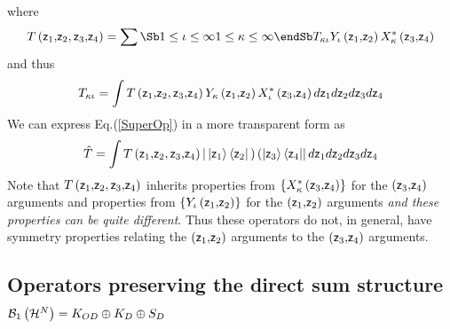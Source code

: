 where 
\begin{equation}
T\left( {\sf z}_{1}{\bf ,}{\sf z}_{2},{\sf z}_{3}{\bf ,}{\sf z}_{4}\right)
=\sum\Sb 1\leq \iota \leq \infty  \\ 1\leq \kappa \leq \infty  \endSb %
T_{\kappa \iota }Y_{\iota }\left( {\sf z}_{1}{\bf ,}{\sf z}_{2}\right)
X_{\kappa }^{\ast }\left( {\sf z}_{3}{\bf ,}{\sf z}_{4}\right)
\end{equation}%
and thus%
\begin{equation}
T_{\kappa \iota }=\int T\left( {\sf z}_{1}{\bf ,}{\sf z}_{2},{\sf z}_{3}{\bf %
,}{\sf z}_{4}\right) Y_{\kappa }\left( {\sf z}_{1}{\bf ,}{\sf z}_{2}\right)
X_{\iota }^{\ast }\left( {\sf z}_{3}{\bf ,}{\sf z}_{4}\right) d{\sf z}_{1}d%
{\sf z}_{2}d{\sf z}_{3}d{\sf z}_{4}
\end{equation}%
We can express Eq.(\ref{SuperOp}) in a more transparent form as%
\begin{equation}
\hat{T}=\int T\left( {\sf z}_{1}{\bf ,}{\sf z}_{2},{\sf z}_{3}{\bf ,}{\sf z}%
_{4}\right) |\left| {\sf z}_{1}\right\rangle \left\langle {\sf z}_{2}\right| 
{\bf )}\left( \left| {\sf z}_{3}\right\rangle \left\langle {\sf z}%
_{4}\right| \right| d{\sf z}_{1}d{\sf z}_{2}d{\sf z}_{3}d{\sf z}_{4}
\end{equation}%
Note that $T\left( {\sf z}_{1}{\bf ,}{\sf z}_{2},{\sf z}_{3}{\bf ,}{\sf z}%
_{4}\right) $ inherits properties from $\left\{ X_{\kappa }^{\ast }\left( 
{\sf z}_{3}{\bf ,}{\sf z}_{4}\right) \right\} $ for the $\left( {\sf z}_{3}%
{\bf ,}{\sf z}_{4}\right) $ arguments and properties from $\left\{ Y_{\iota
}\left( {\sf z}_{1}{\bf ,}{\sf z}_{2}\right) \right\} $ for the $\left( {\sf %
z}_{1}{\bf ,}{\sf z}_{2}\right) $ arguments {\it and these properties can be
quite different}. Thus these operators do not, in general, have symmetry
properties relating the $\left( {\sf z}_{1}{\bf ,}{\sf z}_{2}\right) $
arguments to the $\left( {\sf z}_{3}{\bf ,}{\sf z}_{4}\right) $ arguments.

\subsection{Operators preserving the direct sum structure ${\cal B}%
_{1}\left( {\cal H}^{N}\right) =K_{OD}\oplus K_{D}\oplus S_{D}$}

